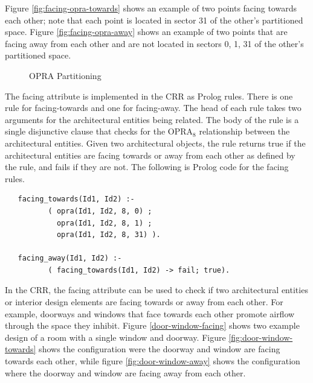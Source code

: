 \documentclass[12pt]{ucthesis}
\begin{document}
Figure \ref{fig:facing-opra-towards} shows an example of two points facing towards each other; note that each point is located in sector 31 of the other's partitioned space.  Figure \ref{fig:facing-opra-away} shows an example of two points that are facing away from each other and are not located in sectors 0, 1, 31 of the other's partitioned space. 

\begin{figure}[t]
 \centering
  \hspace{10 mm}
 \caption{OPRA Partitioning }
\label{opra-facing}
\end{figure}

The facing attribute is implemented in the CRR as Prolog rules. There is one rule for facing-towards and one for facing-away. The head of each rule takes two arguments for the architectural entities being related. The body of the rule is a single disjunctive clause that checks for the OPRA$_{8}$ relationship between the architectural entities. Given two architectural objects, the rule returns true if the architectural entities are facing towards or away from each other as defined by the rule, and fails if they are not. The following is Prolog code for the facing rules.

\begin{verbatim}
   facing_towards(Id1, Id2) :- 
          ( opra(Id1, Id2, 8, 0) ;
            opra(Id1, Id2, 8, 1) ;
            opra(Id1, Id2, 8, 31) ).
                                 
   facing_away(Id1, Id2) :- 
          ( facing_towards(Id1, Id2) -> fail; true).                     
\end{verbatim}

In the CRR, the facing attribute can be used to check if two architectural entities or interior design elements are facing towards or away from each other. For example, doorways and windows that face towards each other promote airflow through the space they inhibit. Figure \ref{door-window-facing} shows two example design of a room with a single window and doorway. Figure \ref{fig:door-window-towards} shows the configuration were the doorway and window are facing towards each other, while figure \ref{fig:door-window-away} shows the configuration where the doorway and window are facing away from each other. 
\end{document}
